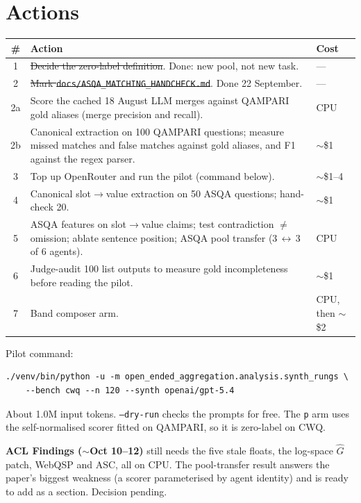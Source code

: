 \documentclass[11pt]{article}
\newcommand{\code}[1]{\texttt{#1}}
\begin{document}
\section{Actions}

\begin{center}
\small
\begin{tabularx}{\linewidth}{cLl}
\toprule
\# & Action & Cost \\
 & \sout{Decide the zero-label definition}. Done: new pool, not new task. & --- \\
2 & \sout{Mark \code{docs/ASQA\_MATCHING\_HANDCHECK.md}}. Done 22 September. & --- \\
2a & Score the cached 18 August LLM merges against QAMPARI gold aliases
     (merge precision and recall). & CPU \\
2b & Canonical extraction on 100 QAMPARI questions; measure missed matches and
     false matches against gold aliases, and F1 against the regex parser. & $\sim$\$1 \\
3 & Top up OpenRouter and run the pilot (command below). & $\sim$\$1--4 \\
4 & Canonical slot$\to$value extraction on 50 ASQA questions; hand-check 20. & $\sim$\$1 \\
5 & ASQA features on slot$\to$value claims; test contradiction $\neq$ omission;
    ablate sentence position; ASQA pool transfer (3\,$\leftrightarrow$\,3 of 6 agents). & CPU \\
6 & Judge-audit 100 list outputs to measure gold incompleteness before reading the pilot. & $\sim$\$1 \\
7 & Band composer arm. & CPU, then $\sim$\$2 \\
\bottomrule
\end{tabularx}
\end{center}

Pilot command:
\begin{verbatim}
./venv/bin/python -u -m open_ended_aggregation.analysis.synth_rungs \
    --bench cwq --n 120 --synth openai/gpt-5.4
\end{verbatim}
About 1.0M input tokens. \code{--dry-run} checks the prompts for free. The
\code{p} arm uses the self-normalised scorer fitted on QAMPARI, so it is
zero-label on CWQ.

\textbf{ACL Findings ($\sim$Oct 10--12)} still needs the five stale floats, the
log-space $\hat G$ patch, WebQSP and ASC, all on CPU. The pool-transfer result
answers the paper's biggest weakness (a scorer parameterised by agent identity)
and is ready to add as a section. Decision pending.
\end{document}
